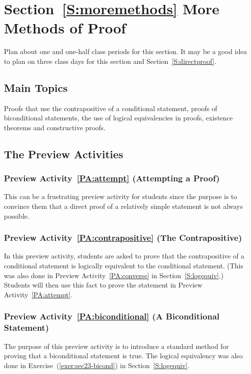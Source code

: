 \section*{Section~\ref{S:moremethods} More Methods of Proof}
Plan about one and one-half class periods for this section.  It may be a good idea to plan on three class days for this section and Section~\ref{S:directproof}.  


\subsection*{Main Topics}
Proofs that use the contrapositive of a conditional statement, proofs of biconditional statements, the use of logical equivalencies in proofs, existence theorems and constructive proofs.

\subsection*{The Preview Activities}
\subsubsection*{Preview Activity~\ref{PA:attempt} (Attempting a Proof)} 
This can be a frustrating preview activity for students since the purpose is to convince them that a direct proof of a relatively simple statement is not always possible.

\subsubsection*{Preview Activity~\ref{PA:contrapositive} (The Contrapositive)}  
In this preview activity, students are asked to prove that the contrapositive of a conditional statement is logically equivalent to the conditional statement.  (This was also done in Preview Activity~\ref{PA:converse} in Section~\ref{S:logequiv}.)  Students will then use this fact to prove the statement in Preview Activity~\ref{PA:attempt}.

\subsubsection*{Preview Activity~\ref{PA:biconditional} (A Biconditional Statement)}
The purpose of this preview activity is to introduce a standard method for proving that a biconditional statement is true.  The logical equivalency was also done in 
Exercise~(\ref{exer:sec23-bicond}) in Section~\ref{S:logequiv}.
\hbreak


